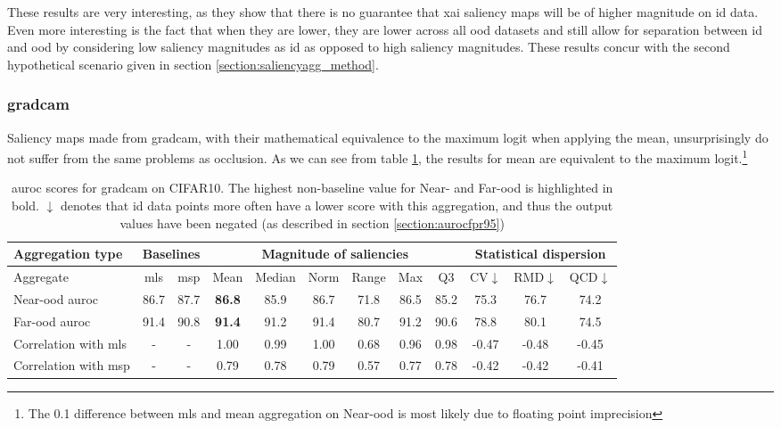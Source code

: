 \documentclass[UKenglish]{uiomasterthesis} %
\theoremstyle{definition}
\begin{document}
These results are very interesting, as they show that there is no guarantee that \ac{xai} saliency maps will be of higher magnitude on \ac{id} data. Even more interesting is the fact that when they are lower, they are lower across all \ac{ood} datasets and still allow for separation between \ac{id} and \ac{ood} by considering low saliency magnitudes as \ac{id} as opposed to high saliency magnitudes. These results concur with the second hypothetical scenario given in section \ref{section:saliencyagg_method}.

\subsubsection{\ac{gradcam}}

Saliency maps made from \ac{gradcam}, with their mathematical equivalence to the maximum logit when applying the mean, unsurprisingly do not suffer from the same problems as occlusion. As we can see from table \ref{table:cifar10_gradcam_metrics}, the results for mean are equivalent to the maximum logit.\footnote{The 0.1 difference between \ac{mls} and mean aggregation on Near-\ac{ood} is most likely due to floating point imprecision}

\begin{table}[H]
\setlength\tabcolsep{3pt}
\begin{center}
\begin{tabular}{ |p{5.1em}|c c|c c c c c c|c c c| }
    \hline
     \centering Aggregation type & \multicolumn{2}{c|}{Baselines} & \multicolumn{6}{c|}{Magnitude of saliencies} & \multicolumn{3}{p{8em}|}{\centering Statistical dispersion} \\
    \hline
    Aggregate & \ac{mls} & \ac{msp} & Mean & Median & Norm & Range & Max & Q3 & CV$\downarrow$ & RMD$\downarrow$ & QCD$\downarrow$  \\
    \hline
    \rowcolor{near!50}
    Near-\ac{ood} \ac{auroc} & 86.7 & 87.7 &\textbf{ 86.8 }& 85.9 & 86.7 & 71.8 & 86.5 & 85.2 & 75.3 & 76.7 & 74.2  \\
    \hline
    \rowcolor{far!50}
    Far-\ac{ood} \ac{auroc} & 91.4 & 90.8 &\textbf{ 91.4 }& 91.2 & 91.4 & 80.7 & 91.2 & 90.6 & 78.8 & 80.1 & 74.5  \\
    \hline
    Correlation with \ac{mls}& - & - & 1.00 & 0.99 & 1.00 & 0.68 & 0.96 & 0.98 & -0.47 & -0.48 & -0.45  \\
    \hline
    Correlation with \ac{msp}& - & - & 0.79 & 0.78 & 0.79 & 0.57 & 0.77 & 0.78 & -0.42 & -0.42 & -0.41  \\
    \hline
    \end{tabular}
    \caption[\ac{auroc} scores for \ac{gradcam} on CIFAR10]{\ac{auroc} scores for \ac{gradcam} on CIFAR10. The highest non-baseline value for Near- and Far-\ac{ood} is highlighted in bold. $\downarrow$ denotes that \ac{id} data points more often have a lower score with this aggregation, and thus the output values have been negated (as described in section \ref{section:aurocfpr95})}
    \label{table:cifar10_gradcam_metrics}
\end{center}
\setlength\tabcolsep{6pt}
\end{table}
\end{document}
